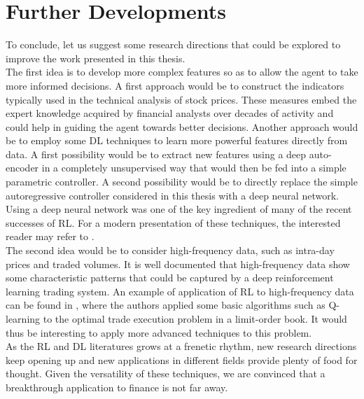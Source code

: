 \section{Further Developments}
To conclude, let us suggest some research directions that could be explored to improve the work presented in this thesis.\\ 
The first idea is to develop more complex features so as to allow the agent to take more informed decisions. A first approach would be to construct the indicators typically used in the technical analysis of stock prices. These measures embed the expert knowledge acquired by financial analysts over decades of activity and could help in guiding the agent towards better decisions. Another approach would be to employ some \gls{DL} techniques to learn more powerful features directly from data. A first possibility would be to extract new features using a deep auto-encoder in a completely unsupervised way that would then be fed into a simple parametric controller. A second possibility would be to directly replace the simple autoregressive controller considered in this thesis with a deep neural network. Using a deep neural network was one of the key ingredient of many of the recent successes of \gls{RL}. For a modern presentation of these techniques, the interested reader may refer to \cite{bengio2015deep}.\\
The second idea would be to consider high-frequency data, such as intra-day prices and traded volumes. It is well documented that high-frequency data show some characteristic patterns that could be captured by a deep reinforcement learning trading system. An example of application of \gls{RL} to high-frequency data can be found in \cite{nevmyvaka2006reinforcement}, where the authors applied some basic algorithms such as Q-learning to the optimal trade execution problem in a limit-order book. It would thus be interesting to apply more advanced techniques to this problem.\\
As the \gls{RL} and \gls{DL} literatures grows at a frenetic rhythm, new research directions keep opening up and new applications in different fields provide plenty of food for thought. Given the versatility of these techniques, we are convinced that a breakthrough application to finance is not far away. 


